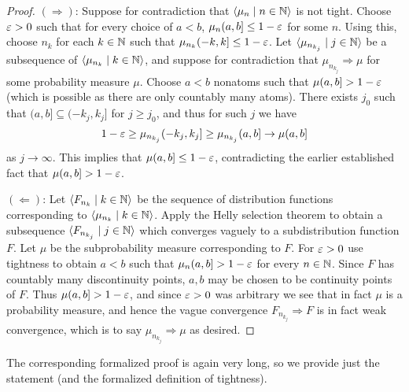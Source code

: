 \documentclass[leqno]{article}
\theoremstyle{definition}
\newcommand{\bldseq}[2]{\langle{#1}\mid{#2}\rangle}
\begin{document}
\begin{proof}
$(\Longrightarrow)$: Suppose for contradiction that $\bldseq{\mu_n}{n \in \N}$ is not tight. Choose $\varepsilon > 0$ such that for every choice of $a < b$, $\mu_n (a,b] \le 1 - \varepsilon$ for some $n$. Using this, choose $n_k$ for each $k \in \mathbb{N}$ such that $\mu_{n_k} (-k,k] \le 1 - \varepsilon$. Let $\bldseq{\mu_{n_{k_j}}}{j \in \N}$ be a subsequence of $\bldseq{\mu_{n_k}}{k \in \N}$, and suppose for contradiction that $\mu_{n_{k_j}} \Rightarrow \mu$ for some probability measure $\mu$. Choose $a < b$ nonatoms such that $\mu (a,b] > 1 - \varepsilon$ (which is possible as there are only countably many atoms). There exists $j_0$ such that $(a,b] \subseteq (-k_j, k_j]$ for $j \ge j_0$, and thus for such $j$ we have
\[ 1 - \varepsilon \ge \mu_{n_{k_j}} (-k_j, k_j] \ge \mu_{n_{k_j}} (a,b] \rightarrow \mu (a,b] \]
as $j \rightarrow \infty$. This implies that $\mu (a,b] \le 1 - \varepsilon$, contradicting the earlier established fact that $\mu (a,b] > 1 - \varepsilon$.

$(\Longleftarrow)$: Let $\bldseq{F_{n_k}}{k \in \N}$ be the sequence of distribution functions corresponding to $\bldseq{\mu_{n_k}}{k \in \N}$. Apply the Helly selection theorem to obtain a subsequence $\bldseq{F_{n_{k_j}}}{j \in \N}$ which converges vaguely to a subdistribution function $F$. Let $\mu$ be the subprobability measure corresponding to $F$. For $\varepsilon > 0$ use tightness to obtain $a < b$ such that $\mu_n (a,b] > 1 - \varepsilon$ for every $n \in \mathbb{N}$. Since $F$ has countably many discontinuity points, $a,b$ may be chosen to be continuity points of $F$. Thus $\mu (a,b] > 1 - \varepsilon$, and since $\varepsilon > 0$ was arbitrary we see that in fact $\mu$ is a probability measure, and hence the vague convergence $F_{n_{k_j}} \Rightarrow F$ is in fact weak convergence, which is to say $\mu_{n_{k_j}} \Rightarrow \mu$ as desired.
\end{proof}

The corresponding formalized proof is again very long, so we provide just the statement (and the formalized definition of tightness).

\medskip
\end{document}
